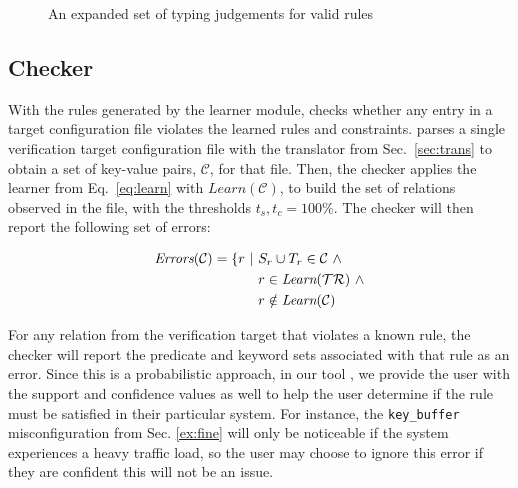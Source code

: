 {
\setlength{\abovecaptionskip}{-.05pt}
\setlength{\belowcaptionskip}{-15pt}
\begin{figure}
\caption{An expanded set of typing judgements for valid rules}
\label{fig:allrules}
\end{figure}
}

\subsection{Checker}
\label{sec-checker}

With the rules generated by the learner module, \app checks whether any entry in a target configuration file violates the learned rules and constraints.
\app parses a single verification target configuration file with the translator from Sec.~\ref{sec:trans}  to obtain a set of key-value pairs, $\mathcal{C}$, for that file.
Then, the checker applies the learner from Eq.~\ref{eq:learn} with $\textit{Learn}(\mathcal{C})$,
  to build the set of relations observed in the file, with the thresholds $t_s,t_c = 100\%$. 
The checker will then report the following set of errors:

\begin{align*}
\textit{Errors}(\mathcal{C}) = \{ r\ |\ & S_r \cup T_r \in \mathcal{C} \ \land \\
                               & r \in \textit{Learn}(\mathcal{TR}) \ \land \\
                               & r \notin \textit{Learn}(\mathcal{C})
\end{align*}

For any relation from the verification target that violates a known rule, the checker will report the predicate and keyword sets associated with that rule as an error.
Since this is a probabilistic approach, in our tool \app, we provide the user with the support and confidence values as well to help the user determine if the rule must be satisfied in their particular system.
For instance, the \texttt{key\_buffer} misconfiguration from Sec. \ref{ex:fine} will only be noticeable if the system experiences a heavy traffic load, so the user may choose to ignore this error if they are confident this will not be an issue.

